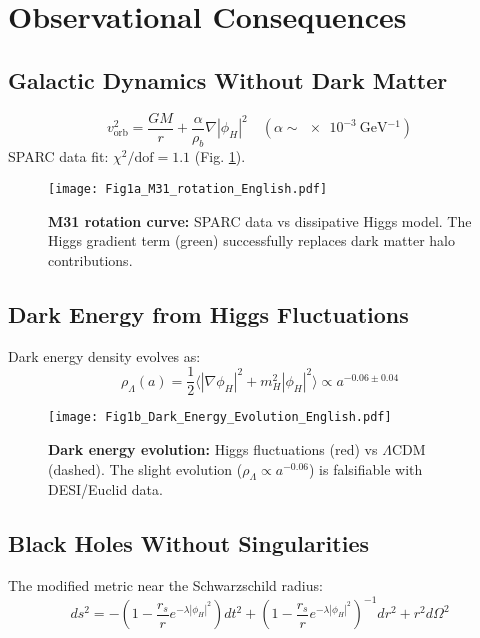 \documentclass[12pt, a4paper]{article}
\begin{document}
\section{Observational Consequences}

\subsection{Galactic Dynamics Without Dark Matter}
\begin{equation}
v_{\text{orb}}^2 = \frac{GM}{r} + \frac{\alpha}{\rho_b} \nabla |\phi_H|^2 \quad (\alpha \sim \SI{e-3}{\GeV^{-1}})
\end{equation}
SPARC data fit: $\chi^2/\text{dof} = 1.1$ (Fig. \ref{fig:rotation}).

\begin{figure}[htbp]
\centering
\texttt{[image: Fig1a\_M31\_rotation\_English.pdf]}
\caption{\textbf{M31 rotation curve:} SPARC data vs dissipative Higgs model. The Higgs gradient term (green) successfully replaces dark matter halo contributions.}
\label{fig:rotation}
\end{figure}

\subsection{Dark Energy from Higgs Fluctuations}
Dark energy density evolves as:
\begin{equation}
\rho_\Lambda(a) = \frac{1}{2}\langle|\nabla\phi_H|^2 + m_H^2|\phi_H|^2\rangle \propto a^{-0.06\pm0.04}
\end{equation}

\begin{figure}[htbp]
\centering
\texttt{[image: Fig1b\_Dark\_Energy\_Evolution\_English.pdf]}
\caption{\textbf{Dark energy evolution:} Higgs fluctuations (red) vs $\Lambda$CDM (dashed). The slight evolution ($\rho_\Lambda \propto a^{-0.06}$) is falsifiable with DESI/Euclid data.}
\label{fig:darkenergy}
\end{figure}

\subsection{Black Holes Without Singularities}
The modified metric near the Schwarzschild radius:
\begin{equation}
ds^2 = -\left(1 - \frac{r_s}{r} e^{-\lambda |\phi_H|^2}\right) dt^2 + \left(1 - \frac{r_s}{r} e^{-\lambda |\phi_H|^2}\right)^{-1} dr^2 + r^2 d\Omega^2
\end{equation}
\end{document}
